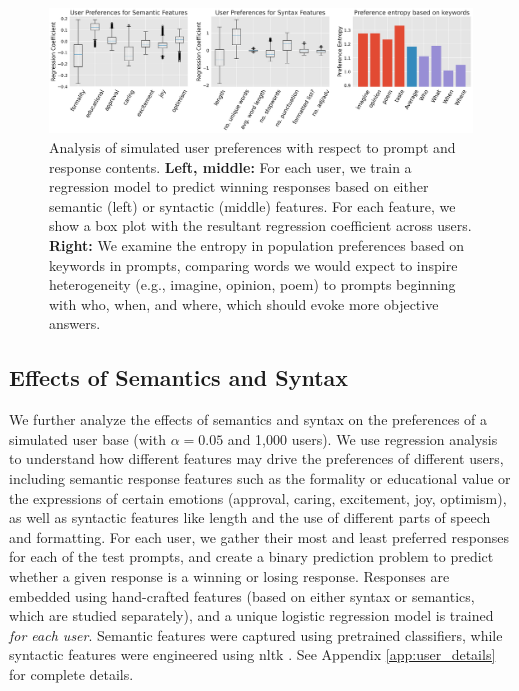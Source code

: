 \begin{figure}[t]
    \centering 
    \includegraphics[width=\linewidth]{../figures/syn_sem_ent.png}
    \caption{Analysis of simulated user preferences with respect to prompt and response contents.
    \textbf{Left, middle:} For each user, we train a regression model to predict winning responses based on either semantic (left) or syntactic (middle) features.  For each feature, we show a box plot with the resultant regression coefficient across users.
    \textbf{Right:} We examine the entropy in population preferences based on keywords in prompts, comparing words we would expect to inspire heterogeneity (e.g., imagine, opinion, poem) to prompts beginning with who, when, and where, which should evoke more objective answers. 
    }
    \label{fig:sem_syn}
\end{figure}

\subsection{Effects of Semantics and Syntax}


We further analyze the effects of semantics and syntax on the preferences of a simulated user base (with $\alpha=0.05$ and 1,000 users).  We use regression analysis to understand how different features may drive the preferences of different users, including semantic response features such as the formality or educational value or the expressions of certain emotions (approval, caring, excitement, joy, optimism), as well as syntactic features like length and the use of different parts of speech and formatting.
For each user, we gather their most and least preferred responses for each of the test prompts, and create a binary prediction problem to predict whether a given response is a winning or losing response.
Responses are embedded using hand-crafted features (based on either syntax or semantics, which are studied separately), and a unique logistic regression model is trained \textit{for each user}.
Semantic features were captured using pretrained classifiers, while syntactic features were engineered using nltk \citep{bird-loper-2004-nltk}.  See Appendix \ref{app:user_details} for complete details.

